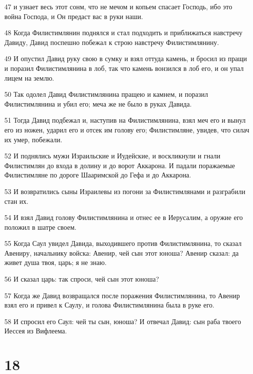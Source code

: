 \par 47 и узнает весь этот сонм, что не мечом и копьем спасает Господь, ибо это война Господа, и Он предаст вас в руки наши.
\par 48 Когда Филистимлянин поднялся и стал подходить и приближаться навстречу Давиду, Давид поспешно побежал к строю навстречу Филистимлянину.
\par 49 И опустил Давид руку свою в сумку и взял оттуда камень, и бросил из пращи и поразил Филистимлянина в лоб, так что камень вонзился в лоб его, и он упал лицем на землю.
\par 50 Так одолел Давид Филистимлянина пращею и камнем, и поразил Филистимлянина и убил его; меча же не было в руках Давида.
\par 51 Тогда Давид подбежал и, наступив на Филистимлянина, взял меч его и вынул его из ножен, ударил его и отсек им голову его; Филистимляне, увидев, что силач их умер, побежали.
\par 52 И поднялись мужи Израильские и Иудейские, и воскликнули и гнали Филистимлян до входа в долину и до ворот Аккарона. И падали поражаемые Филистимляне по дороге Шааримской до Гефа и до Аккарона.
\par 53 И возвратились сыны Израилевы из погони за Филистимлянами и разграбили стан их.
\par 54 И взял Давид голову Филистимлянина и отнес ее в Иерусалим, а оружие его положил в шатре своем.
\par 55 Когда Саул увидел Давида, выходившего против Филистимлянина, то сказал Авениру, начальнику войска: Авенир, чей сын этот юноша? Авенир сказал: да живет душа твоя, царь; я не знаю.
\par 56 И сказал царь: так спроси, чей сын этот юноша?
\par 57 Когда же Давид возвращался после поражения Филистимлянина, то Авенир взял его и привел к Саулу, и голова Филистимлянина была в руке его.
\par 58 И спросил его Саул: чей ты сын, юноша? И отвечал Давид: сын раба твоего Иессея из Вифлеема.

\chapter{18}

